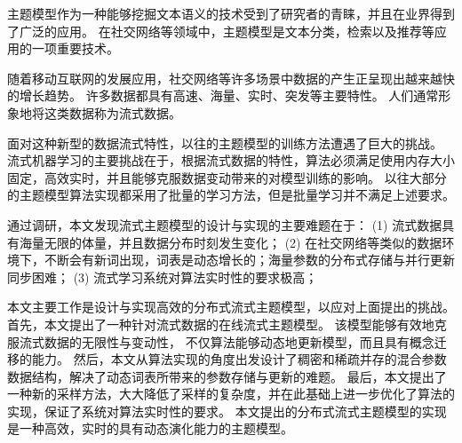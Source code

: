 \begin{cabstract}
主题模型作为一种能够挖掘文本语义的技术受到了研究者的青睐，并且在业界得到了广泛的应用。
在社交网络等领域中，主题模型是文本分类，检索以及推荐等应用的一项重要技术。

随着移动互联网的发展应用，社交网络等许多场景中数据的产生正呈现出越来越快的增长趋势。
许多数据都具有高速、海量、实时、突发等主要特性。
人们通常形象地将这类数据称为流式数据。

面对这种新型的数据流式特性，以往的主题模型的训练方法遭遇了巨大的挑战。
流式机器学习的主要挑战在于，根据流式数据的特性，算法必须满足使用内存大小固定，高效实时，并且能够克服数据变动带来的对模型训练的影响。
以往大部分的主题模型算法实现都采用了批量的学习方法，但是批量学习并不满足上述要求。

通过调研，本文发现流式主题模型的设计与实现的主要难题在于：
(1) 流式数据具有海量无限的体量，并且数据分布时刻发生变化； 
(2) 在社交网络等类似的数据环境下，不断会有新词出现，词表是动态增长的；海量参数的分布式存储与并行更新同步困难；
(3) 流式学习系统对算法实时性的要求极高；

本文主要工作是设计与实现高效的分布式流式主题模型，以应对上面提出的挑战。
首先，本文提出了一种针对流式数据的在线流式主题模型。
该模型能够有效地克服流式数据的无限性与变动性，
不仅算法能够动态地更新模型，而且具有概念迁移的能力。
然后，本文从算法实现的角度出发设计了稠密和稀疏并存的混合参数数据结构，解决了动态词表所带来的参数存储与更新的难题。
最后，本文提出了一种新的采样方法，大大降低了采样的复杂度，并在此基础上进一步优化了算法的实现，保证了系统对算法实时性的要求。
本文提出的分布式流式主题模型的实现是一种高效，实时的具有动态演化能力的主题模型。

\end{cabstract}


